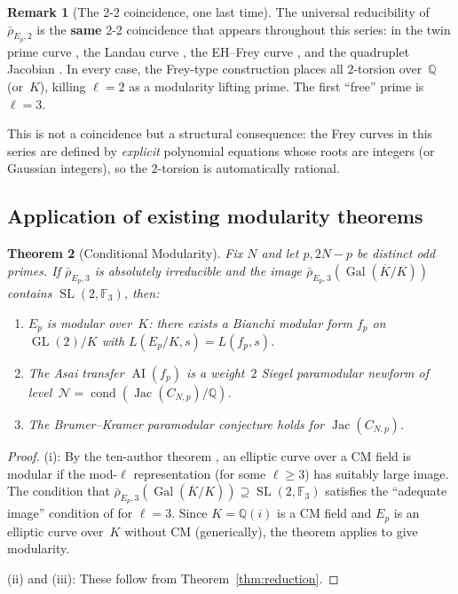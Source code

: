 \documentclass[11pt,a4paper]{article}
\newtheorem{theorem}{Theorem}[section]
\theoremstyle{definition}
\newtheorem{remark}[theorem]{Remark}
\DeclareMathOperator{\Gal}{Gal}
\DeclareMathOperator{\GL}{GL}
\DeclareMathOperator{\SL}{SL}
\DeclareMathOperator{\Jac}{Jac}
\DeclareMathOperator{\AI}{AI}
\DeclareMathOperator{\cond}{cond}
\begin{document}
\begin{remark}[The 2-2 coincidence, one last time]\label{rem:22}
The universal reducibility of $\bar{\rho}_{E_p,2}$ is the \textbf{same} 2-2 coincidence that appears throughout this series: in the twin prime curve \cite{Companion1}, the Landau curve \cite{Companion4}, the EH--Frey curve \cite{Companion5}, and the quadruplet Jacobian \cite{Companion6}. In every case, the Frey-type construction places all $2$-torsion over~$\mathbb{Q}$ (or~$K$), killing $\ell = 2$ as a modularity lifting prime. The first ``free'' prime is $\ell = 3$.

This is not a coincidence but a structural consequence: the Frey curves in this series are defined by \emph{explicit} polynomial equations whose roots are integers (or Gaussian integers), so the $2$-torsion is automatically rational.
\end{remark}

\subsection{Application of existing modularity theorems}

\begin{theorem}[Conditional Modularity]\label{thm:conditional}
Fix $N$ and let $p, 2N-p$ be distinct odd primes. If $\bar{\rho}_{E_p,3}$ is absolutely irreducible and the image $\bar{\rho}_{E_p,3}(\Gal(\overline{K}/K))$ contains $\SL(2, \mathbb{F}_3)$, then:
\begin{enumerate}
    \item[\textup{(i)}] $E_p$ is modular over~$K$: there exists a Bianchi modular form $f_p$ on $\GL(2)/K$ with $L(E_p/K, s) = L(f_p, s)$.
    \item[\textup{(ii)}] The Asai transfer $\AI(f_p)$ is a weight~$2$ Siegel paramodular newform of level~$\mathcal{N} = \cond(\Jac(C_{N,p})/\mathbb{Q})$.
    \item[\textup{(iii)}] The Brumer--Kramer paramodular conjecture holds for $\Jac(C_{N,p})$.
\end{enumerate}
\end{theorem}
\begin{proof}
(i): By the ten-author theorem \cite{TenAuthor}, an elliptic curve over a CM field is modular if the mod-$\ell$ representation (for some $\ell \ge 3$) has suitably large image. The condition that $\bar{\rho}_{E_p,3}(\Gal(\overline{K}/K)) \supseteq \SL(2, \mathbb{F}_3)$ satisfies the ``adequate image'' condition of \cite{TenAuthor} for $\ell = 3$. Since $K = \mathbb{Q}(i)$ is a CM field and $E_p$ is an elliptic curve over~$K$ without CM (generically), the theorem applies to give modularity.

(ii) and (iii): These follow from Theorem~\ref{thm:reduction}. \qedhere
\end{proof}
\end{document}

